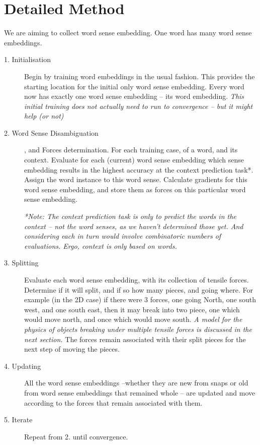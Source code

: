 \documentclass{article}
\begin{document}
\section{Detailed Method}
We are aiming to collect word sense embedding. One word has many word sense embeddings.

\begin{description}
	\item[1. Initialisation] Begin by training word embeddings in the usual fashion. This provides the starting location for the initial only word sense embedding. Every word now has exactly one word sense embedding -- its word embedding. \emph{This initial training does not actually need to run to convergence -- but it might help (or not)}
	
	\item[2. Word Sense Disambiguation], and Forces determination. For each training case, of a word, and its context. Evaluate for each (current) word sense embedding which sense embedding results in the highest accuracy at the context prediction task*. Assign the word instance to this word sense. Calculate gradients for this word sense embedding, and store them as forces on this particular word sense embedding.
	
	\emph{*Note: The context prediction task is only to predict the words in the context -- not the word senses, as we haven't determined those yet. And considering each in turn would involve combinatoric numbers of evaluations. Ergo, context is only based on words.}
	
	\item[3. Splitting] Evaluate each word sense embedding, with its collection of tensile forces. Determine if it will split, and if so how many pieces, and going where. For example (in the 2D case) if there were 3 forces, one going North, one south west, and one south east, then it may break into two piece, one which would move north, and once which would move south.  \emph{A model for the physics of objects breaking under multiple tensile forces is discussed in the next section.} The forces remain associated with their split pieces  for the next step of moving the pieces.
	
	\item[4. Updating] All the word sense embeddings --whether they are new from snaps or old from word sense embeddings that remained whole -- are updated and move according to the forces that remain associated with them.
	
	\item[5. Iterate]  Repeat from 2. until convergence.
\end{description}
\end{document}

